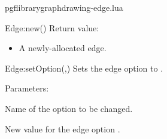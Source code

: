\begin{filedescription}{pgflibrarygraphdrawing-edge.lua}
\begin{luacommand}{{Edge:new}()}
Return value:
\begin{itemize} \item[] A newly-allocated edge.  \end{itemize}


\end{luacommand}\begin{luacommand}{{Edge:setOption}(,)}
Sets the edge option  to . 

Parameters:
\begin{parameterdescription}
	\item[\meta{name}] Name of the option to be changed.\item[\meta{value}] New value for the edge option . 
\end{parameterdescription}



\end{luacommand}
\end{filedescription}